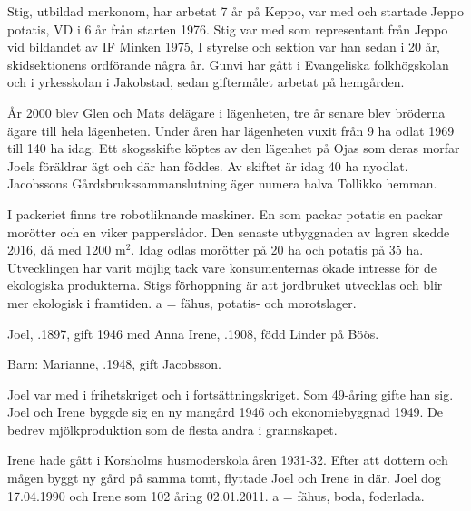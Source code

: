 Stig, utbildad merkonom, har arbetat 7 år på Keppo, var med och startade Jeppo potatis, VD i 6 år från starten 1976. Stig var med som representant från Jeppo vid bildandet av IF Minken 1975, I styrelse och sektion var han sedan i 20 år, skidsektionens ordförande några år. Gunvi har gått i Evangeliska folkhögskolan och i yrkesskolan i Jakobstad, sedan giftermålet arbetat på hemgården.

År 2000 blev Glen och Mats delägare i lägenheten, tre år senare blev bröderna ägare till hela lägenheten. Under åren har lägenheten vuxit från 9 ha odlat 1969 till 140 ha idag. Ett skogsskifte köptes av den lägenhet på Ojas som deras morfar Joels föräldrar ägt och där han föddes. Av skiftet är idag 40 ha nyodlat. Jacobssons Gårdsbrukssammanslutning äger numera halva Tollikko hemman.

I packeriet finns tre robotliknande maskiner. En som packar potatis en packar morötter och en viker papperslådor. Den senaste utbyggnaden av lagren skedde 2016, då med 1200 m$^2$. Idag odlas morötter på 20 ha och potatis på 35 ha. Utvecklingen har varit möjlig tack vare konsumenternas ökade intresse för de ekologiska produkterna. Stigs förhoppning är att jordbruket utvecklas och blir mer ekologisk i framtiden. a = fähus, potatis- och morotslager.


%



%
Joel, .1897, gift 1946 med Anna Irene, .1908, född Linder på Böös.

Barn:  Marianne, .1948, gift Jacobsson.

Joel var med i frihetskriget och i fortsättningskriget. Som 49-åring gifte han sig. Joel och Irene byggde sig en ny mangård 1946 och ekonomiebyggnad 1949. De bedrev mjölkproduktion som de flesta andra i grannskapet.

Irene hade gått i Korsholms husmoderskola åren 1931-32. Efter att dottern och mågen byggt ny gård på samma tomt, flyttade Joel och Irene in där. Joel dog 17.04.1990 och Irene som 102 åring 02.01.2011. a = fähus, boda, foderlada.



%


